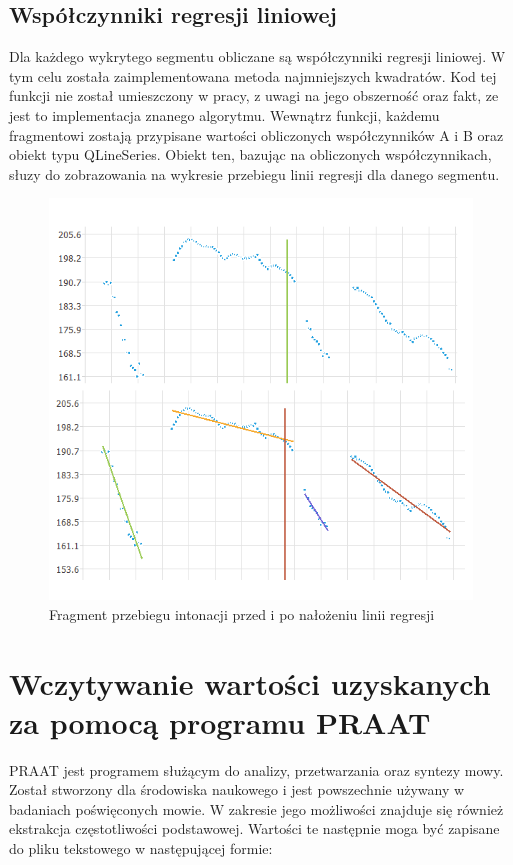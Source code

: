 \documentclass[a4paper,12 pt]{report}
\begin{document}
\subsection{Współczynniki regresji liniowej}
Dla każdego wykrytego segmentu obliczane są współczynniki regresji liniowej. W tym celu została zaimplementowana metoda najmniejszych kwadratów.
Kod tej funkcji nie został umieszczony w pracy, z uwagi na jego obszerność oraz fakt, ze jest to implementacja  znanego algorytmu. Wewnątrz funkcji, każdemu fragmentowi zostają przypisane wartości obliczonych współczynników A i B oraz obiekt typu QLineSeries. Obiekt ten, bazując na obliczonych współczynnikach, słuzy do zobrazowania na wykresie przebiegu linii regresji dla danego segmentu.
 \FloatBarrier
\begin{figure}[h]
\centering
\includegraphics[scale=0.7]{regresja.png}
\caption{Fragment przebiegu intonacji przed i po nałożeniu linii regresji}
\end{figure}
\FloatBarrier
\section{Wczytywanie wartości  uzyskanych za pomocą programu PRAAT}
PRAAT jest programem służącym do analizy, przetwarzania oraz syntezy mowy. Został stworzony dla środowiska naukowego i jest powszechnie używany w badaniach poświęconych mowie. W zakresie jego możliwości znajduje się również ekstrakcja częstotliwości podstawowej. Wartości te następnie moga być zapisane do pliku tekstowego w następującej formie:
\end{document}
